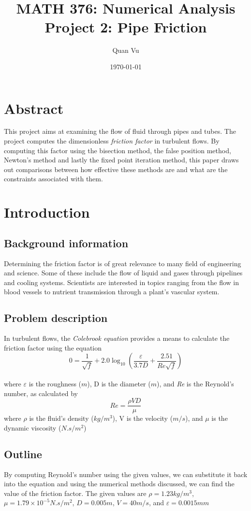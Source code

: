 \documentclass{article}
\title{%
	MATH 376: Numerical Analysis \\
	\large  Project 2: Pipe Friction
	}
\author{Quan Vu}
\date{\today}
\begin{document}
	\maketitle
	
	\section{Abstract}
	This project aims at examining the flow of fluid through pipes and tubes. The project computes the dimensionless \textit{friction factor} in turbulent flows. By computing this factor using the bisection method, the false position method, Newton's method and lastly the fixed point iteration method, this paper draws out comparisons between how effective these methods are and what are the constraints associated with them.
	
	\section{Introduction}
	
	\subsection{Background information}
	Determining the friction factor is of great relevance to many field of engineering and science. Some of these include the flow of liquid and gases through pipelines and cooling systems. Scientists are interested in topics ranging from the flow in blood vessels to nutrient transmission through a plant's vascular system.
	
	\subsection{Problem description}
	In turbulent flows, the \textit{Colebrook equation} provides a means to calculate the friction factor using the equation\\
    \[ 0 =  \frac{1}{\sqrt{f}} + 2.0 \log_{10} \left(\frac{\varepsilon}{3.7D} + \frac{2.51}{\textit{Re}\sqrt{f}}\right) \] \\
    where $\varepsilon$ is the roughness (${m}$), D is the diameter (${m}$), and \textit{Re} is the Reynold's number, as calculated by
    \[\textit{Re} = \frac{\rho V D}{\mu}\]
    where $\rho$ is the fluid's density (${kg/m^{3}}$), V is the velocity (${m/s}$), and ${\mu}$ is the dynamic viscosity (${N.s/m^2}$)
    
	\subsection{Outline}
	By computing Reynold's number using the given values, we can substitute it back into the equation and using the numerical methods discussed, we can find the value of the friction factor. The given values are ${\rho = 1.23 kg/m^3}$, ${\mu = 1.79 \times 10^{-5} N.s/m^2}$, ${D = 0.005 m}$, ${V = 40 m/s}$, and ${\varepsilon = 0.0015 mm}$
	
\end{document}

